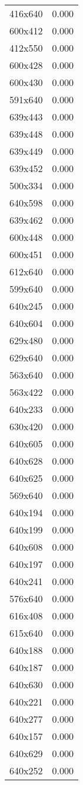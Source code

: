 \begin{table}
\begin{tabular}{lr}
416x640 & 0.000 \\
600x412 & 0.000 \\
412x550 & 0.000 \\
600x428 & 0.000 \\
600x430 & 0.000 \\
591x640 & 0.000 \\
639x443 & 0.000 \\
639x448 & 0.000 \\
639x449 & 0.000 \\
639x452 & 0.000 \\
500x334 & 0.000 \\
640x598 & 0.000 \\
639x462 & 0.000 \\
600x448 & 0.000 \\
600x451 & 0.000 \\
612x640 & 0.000 \\
599x640 & 0.000 \\
640x245 & 0.000 \\
640x604 & 0.000 \\
629x480 & 0.000 \\
629x640 & 0.000 \\
563x640 & 0.000 \\
563x422 & 0.000 \\
640x233 & 0.000 \\
630x420 & 0.000 \\
640x605 & 0.000 \\
640x628 & 0.000 \\
640x625 & 0.000 \\
569x640 & 0.000 \\
640x194 & 0.000 \\
640x199 & 0.000 \\
640x608 & 0.000 \\
640x197 & 0.000 \\
640x241 & 0.000 \\
576x640 & 0.000 \\
616x408 & 0.000 \\
615x640 & 0.000 \\
640x188 & 0.000 \\
640x187 & 0.000 \\
640x630 & 0.000 \\
640x221 & 0.000 \\
640x277 & 0.000 \\
640x157 & 0.000 \\
640x629 & 0.000 \\
640x252 & 0.000 \\

\end{tabular}
\end{table}
